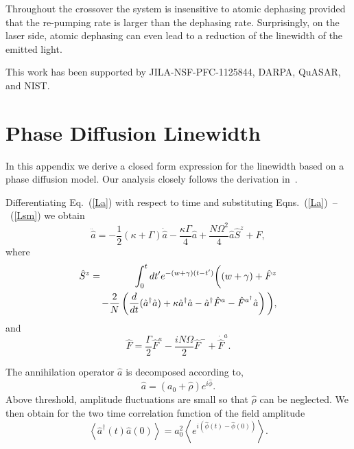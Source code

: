 \documentclass[aps,
twocolumn,
showpacs,
superscriptaddress,groupedaddress]{revtex4}
\begin{document}
Throughout the crossover the system is insensitive to atomic dephasing
provided that the re-pumping rate is larger than the dephasing rate.
Surprisingly, on the laser side, atomic dephasing can even lead to a
reduction of the linewidth of the emitted light.

This work has been supported by JILA-NSF-PFC-1125844, DARPA, QuASAR, and
NIST.

\appendix


\section{Phase Diffusion Linewidth}
\label{HakenAppendix}

In this appendix we derive a closed form expression for the linewidth
based on a phase diffusion model.  Our analysis closely follows the
derivation in~\cite{HakenLaser, HakenLaserBook}.

Differentiating Eq.~(\ref{La}) with respect to time and substituting 
Eqns.~(\ref{La})~--~(\ref{Lsm}) we obtain
\begin{equation}
\ddot{\hat{a}} =
-\frac{1}{2} (\kappa+\Gamma)  \dot{\hat{a}} -
\frac{\kappa \Gamma}{4}\hat{a}  +
\frac{N \Omega^2 }{4} \hat{a} \hat{S}^z +\hat{F},
\label{addeq}
\end{equation}
where
\begin{eqnarray}
\hat{S}^z &=&
\int_0^t dt^{\prime} e^{-(w+\gamma)(t-t^{\prime})}
\bigg( (w+\gamma) + \hat{F}^z
\nonumber
\\
&&\hspace{-3mm}-\frac{2}{N} \left( \frac{d}{dt} (\hat{a}^{\dagger} \hat{a}) +
\kappa \hat{a}^{\dagger} \hat{a} -\hat{a}^{\dagger} \hat{F}^a -
\hat{F}^{a^{\dagger}} \hat{a} \right) \bigg),
\end{eqnarray}
and
\begin{equation}
\hat{F} = \frac{\Gamma}{2} \hat{F}^a-
\frac{i N \Omega}{2} \hat{F}^-+\dot{\hat{F}}^a.
\end{equation}

The annihilation operator $\hat{a}$ is decomposed according to,
\begin{equation}
\hat{a}= (a_0 + \hat{\rho}) e^{i\hat{\phi}}.
\label{adecomp}
\end{equation}
Above threshold, amplitude fluctuations are small so that $\hat\rho$
can be neglected.  We then obtain for the two time correlation function
of the field amplitude
\begin{equation}
\left< \hat{a}^{\dagger}(t) \hat{a}(0) \right> =
a_0^2 \left< e^{i(\hat{\phi}(t) - \hat{\phi}(0))} \right>.
\end{equation}
\end{document}
